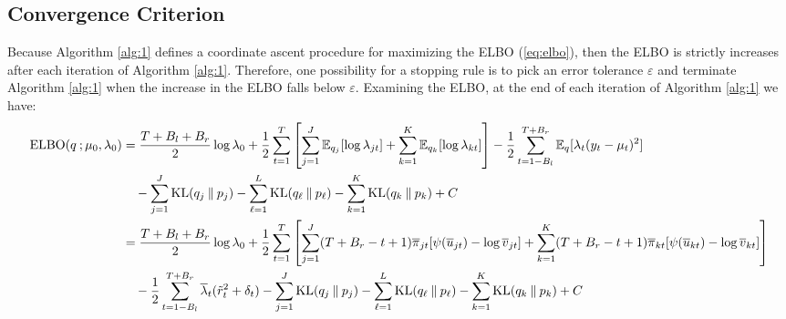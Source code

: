 \subsection{Convergence Criterion}
\label{app:convergence}

Because Algorithm \ref{alg:1} defines a coordinate ascent procedure for maximizing the ELBO (\ref{eq:elbo}), then the ELBO is strictly increases after each iteration of Algorithm \ref{alg:1}. Therefore, one possibility for a stopping rule is to pick an error tolerance $\varepsilon$ and terminate Algorithm \ref{alg:1} when the increase in the ELBO falls below $\varepsilon$. Examining the ELBO, at the end of each iteration of Algorithm \ref{alg:1} we have: 
\scriptsize
\begin{align*} 
    \text{ELBO}(q\:;\mu_0,\lambda_0) &= \frac{T + B_l + B_r}{2} \log \lambda_0 + \frac{1}{2}\sum_{t=1}^T \left[\sum_{j=1}^J \mathbb{E}_{q_j}[\log \lambda_{jt}]+ \sum_{k=1}^K \mathbb{E}_{q_k}[\log \lambda_{kt}]\right] - \frac{1}{2} \sum_{t=1-B_l}^{T+B_r} \mathbb{E}_q[\lambda_t(y_t -\mu_t)^2] \\
    &\quad - \sum_{j=1}^J \text{KL}(q_j\:\lVert\: p_j) - \sum_{\ell=1}^L \text{KL}(q_\ell\:\lVert\: p_\ell) - \sum_{k=1}^K \text{KL}(q_k\:\lVert\: p_k) +C \\
    &= \frac{T + B_l + B_r}{2} \log \lambda_0 + \frac{1}{2}\sum_{t=1}^T \left[\sum_{j=1}^J (T+B_r-t+1)\overline{\pi}_{jt}[\psi(\overline{u}_{jt}) - \log\overline{v}_{jt}]+ \sum_{k=1}^K(T+B_r-t+1)\overline{\pi}_{kt}[\psi(\overline{u}_{kt}) - \log\overline{v}_{kt}]\right] \\
    &\quad- \frac{1}{2} \sum_{t=1-B_l}^{T+B_r} \overline{\lambda}_t(\Tilde{r}_t^2 + \delta_t) - \sum_{j=1}^J \text{KL}(q_j\:\lVert\: p_j) - \sum_{\ell=1}^L \text{KL}(q_\ell\:\lVert\: p_\ell) - \sum_{k=1}^K \text{KL}(q_k\:\lVert\: p_k) +C
\end{align*}
\normalsize

